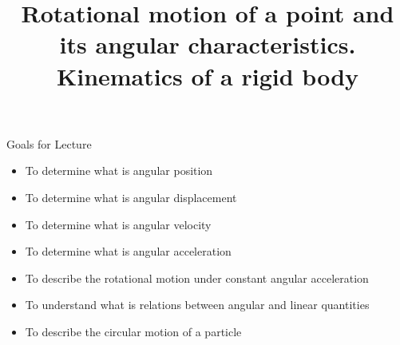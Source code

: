 \documentclass[18pt]{LectMechanics}
\title[Physics 1]{\huge\bfseries Rotational motion of a point and its angular characteristics. Kinematics of a rigid body}
\date{}
\begin{document}
%
\begin{frame}
	\titlepage
\end{frame}
\usebackgroundtemplate{
}




\begin{frame}{Goals for Lecture}{}
	\begin{itemize}
		\item To determine what is angular position
		\item To determine what is angular displacement
		\item To determine what is angular velocity
		\item To determine what is angular acceleration
		\item To describe the rotational motion under constant angular acceleration
		\item To understand what is  relations between angular and linear quantities
		\item To describe the circular motion of a particle
	\end{itemize}
\end{frame}
\end{document}
